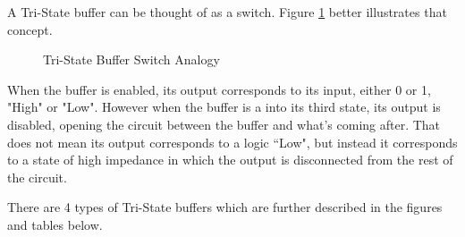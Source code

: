 A Tri-State buffer can be thought of as a switch. Figure \ref{fig:tristate} better illustrates that concept.
\begin{figure}[htp]
	\begin{center}
	\hfill
	\caption{Tri-State Buffer Switch Analogy}
	\label{fig:tristate}
	\end{center}
\end{figure}


When the buffer is enabled, its output corresponds to its input, either 0 or 1, "High" or "Low". However when the buffer is a into its third state, its output is disabled, opening the circuit between the buffer and what’s coming after. That does not mean its output corresponds to a logic “Low", but instead it corresponds to a state of high impedance in which the output is disconnected from the rest of the circuit. 

There are 4 types of Tri-State buffers which are further described in the figures and tables below.

\vspace{10mm}

